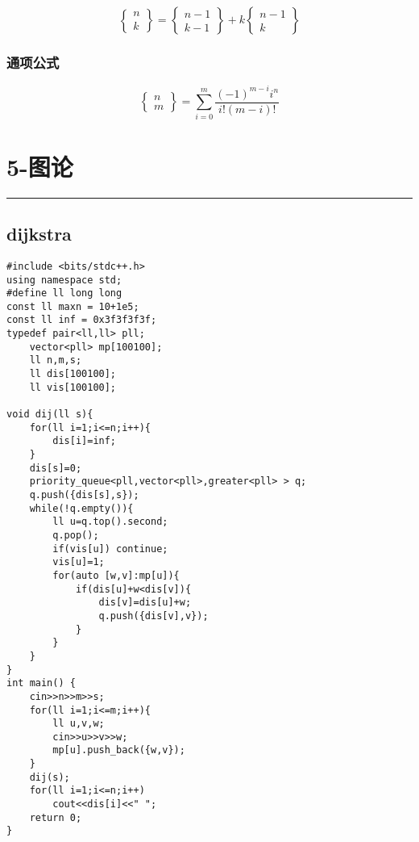 \documentclass[]{article}
\begin{document}
\[
\begin{Bmatrix}n\\ k\end{Bmatrix}=\begin{Bmatrix}n-1\\ k-1\end{Bmatrix}+k\begin{Bmatrix}n-1\\ k\end{Bmatrix}
\]

\hypertarget{ux901aux9879ux516cux5f0f}{%
\subsubsection{通项公式}\label{ux901aux9879ux516cux5f0f}}

\[
\begin{Bmatrix}n\\m\end{Bmatrix}=\sum\limits_{i=0}^m\dfrac{(-1)^{m-i}i^n}{i!(m-i)!}
\]

\hypertarget{ux56feux8bba}{%
\section{5-图论}\label{ux56feux8bba}}

\begin{center}\rule{0.5\linewidth}{0.5pt}\end{center}

\hypertarget{dijkstra}{%
\subsection{dijkstra}\label{dijkstra}}

\begin{verbatim}
#include <bits/stdc++.h>
using namespace std;
#define ll long long
const ll maxn = 10+1e5;
const ll inf = 0x3f3f3f3f;
typedef pair<ll,ll> pll;
    vector<pll> mp[100100];
    ll n,m,s;
    ll dis[100100];
    ll vis[100100];

void dij(ll s){
    for(ll i=1;i<=n;i++){
        dis[i]=inf;
    }
    dis[s]=0;
    priority_queue<pll,vector<pll>,greater<pll> > q;
    q.push({dis[s],s});
    while(!q.empty()){
        ll u=q.top().second;
        q.pop();
        if(vis[u]) continue;
        vis[u]=1;
        for(auto [w,v]:mp[u]){
            if(dis[u]+w<dis[v]){
                dis[v]=dis[u]+w;
                q.push({dis[v],v});
            }
        }
    }
}
int main() {
    cin>>n>>m>>s;
    for(ll i=1;i<=m;i++){
        ll u,v,w;
        cin>>u>>v>>w;
        mp[u].push_back({w,v});
    }
    dij(s);
    for(ll i=1;i<=n;i++)
        cout<<dis[i]<<" ";
    return 0;
}
\end{verbatim}
\end{document}
